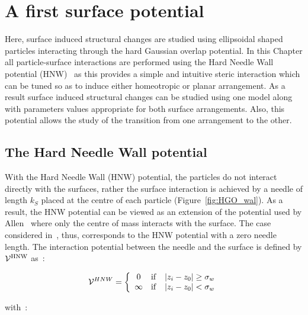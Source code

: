 

\section{A first surface potential}
\label{s:HNWmodel}

Here, surface induced structural changes are studied using ellipsoidal shaped particles interacting
through the hard Gaussian overlap potential. In this Chapter all
particle-surface interactions are performed using the Hard Needle Wall potential 
(HNW)~\cite{Chrzanowska_Teixera_01} as this provides a simple and intuitive steric interaction which
can be tuned so as to induce either homeotropic or planar arrangement. As a result surface
induced structural changes can be studied using one model along with parameters values
appropriate for both surface arrangements.
Also, this potential allows the study of the transition from one arrangement to the other.


\subsection{The Hard Needle Wall potential}
\label{ss:HNW}


With the Hard Needle Wall (HNW) potential, the particles do not interact directly 
with the surfaces,  rather the surface  interaction is achieved by a needle of length 
$k_S$ placed at the centre of each particle
(Figure~\ref{fig:HGO_wal}). As a result, the HNW potential can be viewed as an extension of the
potential used by Allen~\cite{Allen99} where only the centre of mass interacts with the surface.
The case considered in~\cite{Allen99}, thus, corresponds to the HNW potential with a zero needle
length. The interaction potential between the needle and the surface is defined by 
$\mathcal{V}^{\mathrm{HNW}}$ as~:

\begin{equation}
\mathcal{V}^{HNW} = \left\{ %
	\begin{array}{ccc}
	0               &\mrm{if}   &|z_i-z_0| \geq \sigma_w  \\
	\infty          &\mrm{if}   &|z_i-z_0| < \sigma_w
	\end{array}
	\right.
\end{equation}

with~:

